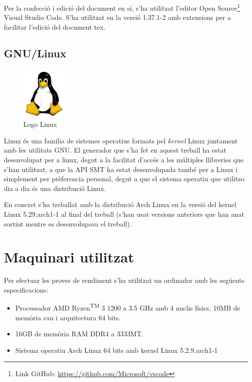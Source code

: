 \documentclass[11pt,a4paper,twoside]{report}
\begin{document}
Per la confecció i edició del document en sí, s'ha utilitzat l'editor Open Source\footnote{Link GitHub: \url{https://github.com/Microsoft/vscode}} Visual Studio Code. S'ha utilitzat en la versió 1.37.1-2 amb extensions per a facilitar l'edició del document tex.



  \subsection{GNU/Linux}
  \begin{figure}[ht!]
    \centering
    \includegraphics[width=0.2\textwidth]{Diagrames/Linux.png}
    \caption{Logo Linux}
    \label{fig:linux}
  \end{figure}
  Linux és una familia de sistemes operatius formats pel \textit{kernel} Linux juntament amb les utilitats GNU. 
  El generador que s'ha fet en aquest treball ha estat desenvolupat per a linux, degut a la facilitat d'accés a les múltiples llibreries que s'han utilitzat, a que la API SMT ha estat desenvolupada també per a Linux i simplement per prèferencia personal, degut a que el sistema operatiu que utilitzo dia a dia és una distribució Linux.

  En concret s'ha treballat amb la distribució Arch Linux en la versió del kernel Linux 5.29.arch1-1 al final del treball (s'han usat versions anteriors que han anat sortint mentre es desenvolupava el treball).


  \section{Maquinari utilitzat}
  Per efectuar les proves de rendiment s'ha utilitzat un ordinador amb les següents especificacions:
  \begin{itemize}
    \item Processador AMD Ryzen\textsuperscript{TM} 3 1200 a 3.5 GHz amb 4 nuclis físics,  10MB de memòria cau i arquitectura 64 bits.
    \item 16GB de memòria RAM DDR4 a 3333MT.
    \item Sistema operatiu Arch Linux 64 bits amb kernel Linux 5.2.9.arch1-1
  \end{itemize} 
  
\end{document}
